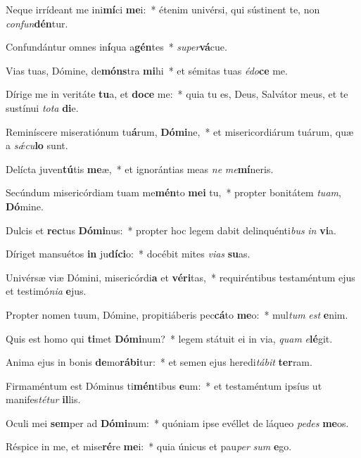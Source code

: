 \item Neque irrídeant me ini\textbf{mí}ci \textbf{me}i:~* étenim univérsi, qui sústinent te, non \textit{con}\textit{fun}\textbf{dén}tur.
\item Confundántur omnes in\textbf{í}qua a\textbf{gén}tes~* \textit{su}\textit{per}\textbf{vá}cue.
\item Vias tuas, Dómine, de\textbf{móns}tra \textbf{mi}hi~* et sémitas tuas \textit{é}\textit{do}\textbf{ce} me.
\item Dírige me in veritáte \textbf{tu}a, et \textbf{do}\textbf{ce} me:~* quia tu es, Deus, Salvátor meus, et te sustínui \textit{to}\textit{ta} \textbf{di}e.
\item Reminíscere miseratiónum tu\textbf{á}rum, \textbf{Dó}\textbf{mi}ne,~* et misericordiárum tuárum, quæ a \textit{sǽ}\textit{cu}\textbf{lo} sunt.
\item Delícta juven\textbf{tú}tis \textbf{me}æ,~* et ignorántias meas \textit{ne} \textit{me}\textbf{mí}neris.
\item Secúndum misericórdiam tuam me\textbf{mén}to \textbf{me}\textbf{i} tu,~* propter bonitátem \textit{tu}\textit{am}, \textbf{Dó}mine.
\item Dulcis et \textbf{rec}tus \textbf{Dó}\textbf{mi}nus:~* propter hoc legem dabit delinquénti\textit{bus} \textit{in} \textbf{vi}a.
\item Díriget mansuétos \textbf{in} ju\textbf{dí}\textbf{ci}o:~* docébit mites \textit{vi}\textit{as} \textbf{su}as.
\item Univérsæ viæ Dómini, misericórdi\textbf{a} et \textbf{vé}\textbf{ri}tas,~* requiréntibus testaméntum ejus et testimó\textit{ni}\textit{a} \textbf{e}jus.
\item Propter nomen tuum, Dómine, propitiáberis pec\textbf{cá}to \textbf{me}o:~* mul\textit{tum} \textit{est} \textbf{e}nim.
\item Quis est homo qui \textbf{ti}met \textbf{Dó}\textbf{mi}num?~* legem státuit ei in via, \textit{quam} \textit{e}\textbf{lé}git.
\item Anima ejus in bonis \textbf{de}mo\textbf{rá}\textbf{bi}tur:~* et semen ejus heredi\textit{tá}\textit{bit} \textbf{ter}ram.
\item Firmaméntum est Dóminus ti\textbf{mén}tibus \textbf{e}um:~* et testaméntum ipsíus ut manifes\textit{té}\textit{tur} \textbf{il}lis.
\item Oculi mei \textbf{sem}per ad \textbf{Dó}\textbf{mi}num:~* quóniam ipse evéllet de láqueo \textit{pe}\textit{des} \textbf{me}os.
\item Réspice in me, et mise\textbf{ré}re \textbf{me}i:~* quia únicus et pau\textit{per} \textit{sum} \textbf{e}go.
